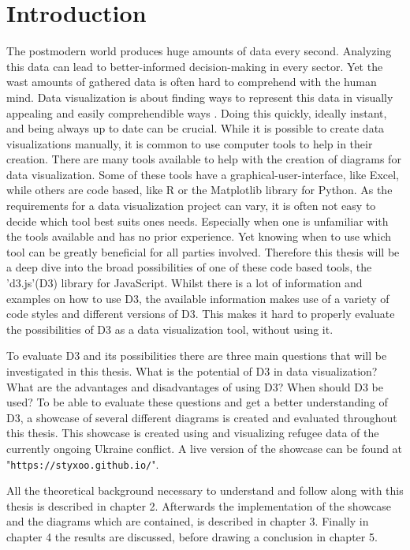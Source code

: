 \chapter{Introduction}


The postmodern world produces huge amounts of data every second. Analyzing this data can lead to better-informed decision-making in every sector. Yet the wast amounts of gathered data is often hard to comprehend with the human mind. Data visualization is about finding ways to represent this data in visually appealing and easily comprehendible ways \cite{sadiku2016data}. Doing this quickly, ideally instant, and being always up to date can be crucial. While it is possible to create data visualizations manually, it is common to use computer tools to help in their creation. There are many tools available to help with the creation of diagrams for data visualization. Some of these tools have a graphical-user-interface, like Excel\cite{excel}, while others are code based, like R\cite{r} or the Matplotlib\cite{matplotlib} library for Python. As the requirements for a data visualization project can vary, it is often not easy to decide which tool best suits ones needs. Especially when one is unfamiliar with the tools available and has no prior experience. Yet knowing when to use which tool can be greatly beneficial for all parties involved. Therefore this thesis will be a deep dive into the broad possibilities of one of these code based tools, the 'd3.js'(D3) library for JavaScript. Whilst there is a lot of information and examples on how to use D3, the available information makes use of a variety of code styles and different versions of D3. This makes it hard to properly evaluate the possibilities of D3 as a data visualization tool, without using it.

To evaluate D3 and its possibilities there are three main questions that will be investigated in this thesis. What is the potential of D3 in data visualization? What are the advantages and disadvantages of using D3? When should D3 be used? To be able to evaluate these questions and get a better understanding of D3, a showcase of several different diagrams is created and evaluated throughout this thesis. This showcase is created using and visualizing refugee data of the currently ongoing Ukraine conflict. A live version of the showcase can be found at "\texttt{https://styxoo.github.io/}".

All the theoretical background necessary to understand and follow along with this thesis is described in chapter 2. Afterwards the implementation of the showcase and the diagrams which are contained, is described in chapter 3. Finally in chapter 4 the results are discussed, before drawing a conclusion in chapter 5.
